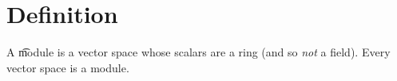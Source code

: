 

\section*{Definition}

A \t{module} is a vector space whose scalars are a ring (and so \textit{not} a field).
Every vector space is a module.

\blankpage